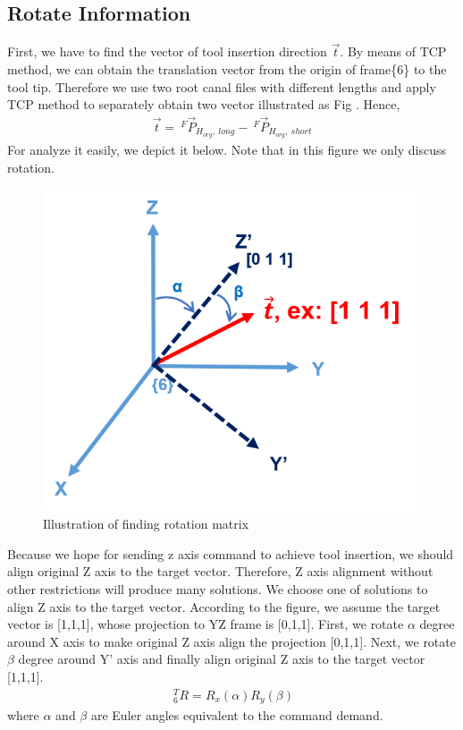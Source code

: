 \documentclass[12pt]{article}
\begin{document}
\begin{CJK}{UTF8}{bsmi}
\section{Rotate Information}
First, we have to find the vector of tool insertion direction $\vec{t}$. By means of TCP method, we can obtain the translation vector from the origin of frame\{6\} to the tool tip. Therefore we use two root canal files with different lengths and apply TCP method to separately obtain two vector illustrated as Fig . Hence, 
\begin{equation}
\begin{split}
\vec{t} =\ ^{F}\vec{P}_{H_{org},\ long} -\ ^{F}\vec{P}_{H_{org},\ short}
\end{split}
\end{equation}
For analyze it easily, we depict it below. Note that in this figure we only discuss rotation.
\begin{figure}[ht]
\label{fig:rot_inf}
\begin{center}
\includegraphics[width=0.8\linewidth]{../Images/rot_inf.png}
\end{center}
\caption{
Illustration of finding rotation matrix
}
\end{figure} 
Because we hope for sending z axis command to achieve tool insertion, we should align original Z axis to the target vector. Therefore, Z axis alignment without other restrictions will produce many solutions. We choose one of solutions to align Z axis to the target vector. According to the figure, we assume the target vector is [1,1,1], whose projection to YZ frame is [0,1,1]. First, we rotate $\alpha$ degree around X axis to make original Z axis align the projection [0,1,1]. Next, we rotate $\beta$ degree around Y' axis and finally align original Z axis to the target vector [1,1,1]. 
\begin{equation}
\begin{split}
\ ^T_6R = R_x\left(\alpha \right) R_y\left(\beta \right)  
\end{split}
\end{equation}
where $\alpha$ and $\beta$ are Euler angles equivalent to the command demand.


\end{CJK}
\end{document}
